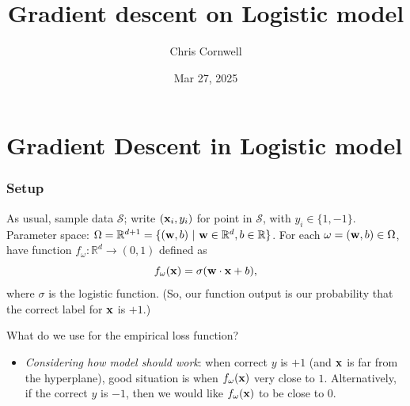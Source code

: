 \documentclass{beamer}
\author{Chris Cornwell}
\date{Mar 27, 2025}
\title{Gradient descent on Logistic model}
\theoremstyle{example}
\begin{document}
\begin{frame}
\titlepage
\end{frame}

\section {Gradient Descent in Logistic model}

\begin{frame}
\frametitle{Setup}
    As usual, sample data $\mathcal S$; write $({\bf x}_i, y_i)$ for point in $\mathcal S$, with $y_i\in\{1, -1\}$. \newline 
    Parameter space: $\Omega = \mathbb R^{d+1} = \{({\bf w},b)\ |\ {\bf w}\in\mathbb R^d, b\in\mathbb R\}$. For each $\omega = ({\bf w},b) \in \Omega$, have function $f_{\omega}:\mathbb R^d\to(0,1)$ defined as 
            \[f_{\omega}({\bf x}) = \sigma({\bf w}\cdot{\bf x} + b),\]
    where $\sigma$ is the logistic function. (So, our function output is our probability that the correct label for ${\bf x}$ is $+1$.)
\pause

\vspace*{12pt}
What do we use for the empirical loss function? 
\begin{itemize}
    \item \textit{Considering how model should work}: when correct $y$ is $+1$ (and ${\bf x}$ is far from the hyperplane), good situation is when $f_{\omega}({\bf x})$ very close to $1$. Alternatively, if the correct $y$ is $-1$, then we would like $f_{\omega}({\bf x})$ to be close to $0$.
\end{itemize}
\end{frame}
\end{document}
